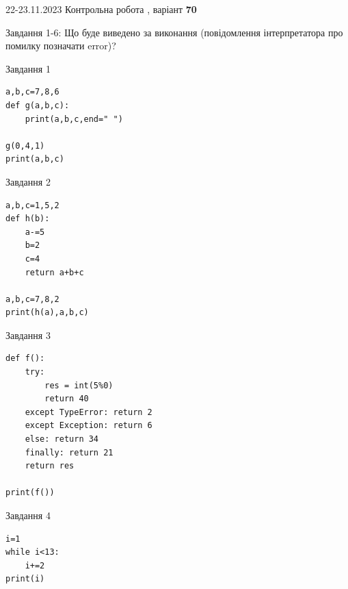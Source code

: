 \documentclass[12pt, ukrainian]{article}
\begin{document}
{{22-23.11.2023 Контрольна робота , варіант  \No \textbf { 70 }\par}}
{

Завдання 1-6: Що буде виведено за виконання (повідомлення інтерпретатора про помилку позначати error)?


\begin{minipage}[t]{9.7cm}                
{\begin{center}Завдання {1}\end{center}}
\begin{verbatim}
a,b,c=7,8,6
def g(a,b,c):
    print(a,b,c,end=" ")

g(0,4,1)
print(a,b,c)
\end{verbatim}     
\end{minipage}
\vline \hspace{8mm}
\begin{minipage}[t]{8.0cm}                
{\begin{center}Завдання {2}\end{center}}
\begin{verbatim}
a,b,c=1,5,2
def h(b):
    a-=5
    b=2
    c=4
    return a+b+c

a,b,c=7,8,2
print(h(a),a,b,c)
\end{verbatim}     
\end{minipage}

\vspace{15mm}
\begin{minipage}[t]{9.7cm}                
{\begin{center}Завдання {3}\end{center}}
\begin{verbatim}
def f():
    try:
        res = int(5%0)
        return 40
    except TypeError: return 2
    except Exception: return 6
    else: return 34
    finally: return 21
    return res

print(f())
\end{verbatim}     
\end{minipage}
\vline \hspace{8mm}
\begin{minipage}[t]{8.0cm}                
{\begin{center}Завдання {4}\end{center}}
\begin{verbatim}
i=1
while i<13:
    i+=2
print(i)
\end{verbatim}     
\end{minipage}

}
\end{document}
